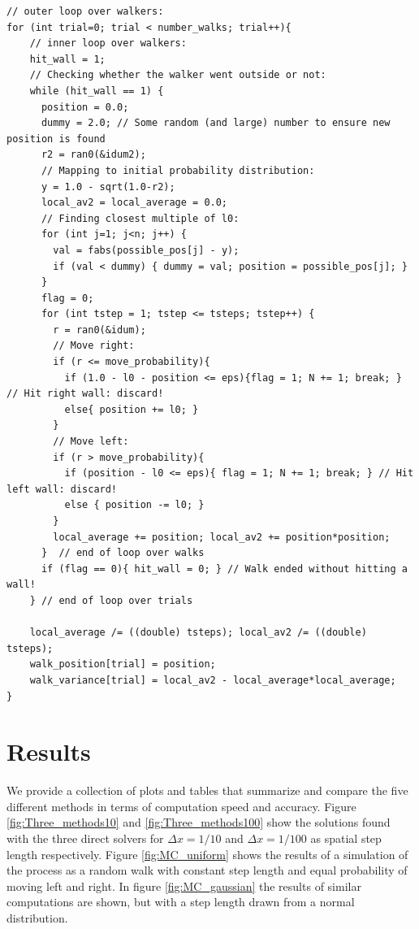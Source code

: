 \documentclass[a4paper, 11pt, notitlepage,english]{article}
\begin{document}
\begin{center}
\begin{lstlisting}
// outer loop over walkers:
for (int trial=0; trial < number_walks; trial++){
    // inner loop over walkers:
    hit_wall = 1;
    // Checking whether the walker went outside or not:
    while (hit_wall == 1) {
      position = 0.0;
      dummy = 2.0; // Some random (and large) number to ensure new position is found
      r2 = ran0(&idum2);
      // Mapping to initial probability distribution:
      y = 1.0 - sqrt(1.0-r2);
      local_av2 = local_average = 0.0;
      // Finding closest multiple of l0:
      for (int j=1; j<n; j++) {
        val = fabs(possible_pos[j] - y);
        if (val < dummy) { dummy = val; position = possible_pos[j]; }
      }
      flag = 0;
      for (int tstep = 1; tstep <= tsteps; tstep++) {
        r = ran0(&idum);
        // Move right:
        if (r <= move_probability){
          if (1.0 - l0 - position <= eps){flag = 1; N += 1; break; } // Hit right wall: discard!
          else{ position += l0; }
        }
        // Move left:
        if (r > move_probability){
          if (position - l0 <= eps){ flag = 1; N += 1; break; } // Hit left wall: discard!
          else { position -= l0; }
        }
        local_average += position; local_av2 += position*position;
      }  // end of loop over walks
      if (flag == 0){ hit_wall = 0; } // Walk ended without hitting a wall!
    } // end of loop over trials

    local_average /= ((double) tsteps); local_av2 /= ((double) tsteps);
    walk_position[trial] = position;
    walk_variance[trial] = local_av2 - local_average*local_average;
}
\end{lstlisting}
\end{center}

\section{Results}
We provide a collection of plots and tables that summarize and compare the five different methods in terms of computation speed and accuracy. Figure \ref{fig:Three_methods10} and \ref{fig:Three_methods100} show the solutions found with the three direct solvers for $\Delta x = 1/10$ and $\Delta x = 1/100$ as spatial step length respectively. Figure \ref{fig:MC_uniform} shows the results of a simulation of the process as a random walk with constant step length and equal probability of moving left and right. In figure \ref{fig:MC_gaussian} the results of similar computations are shown, but with a step length drawn from a normal distribution.
\end{document}
